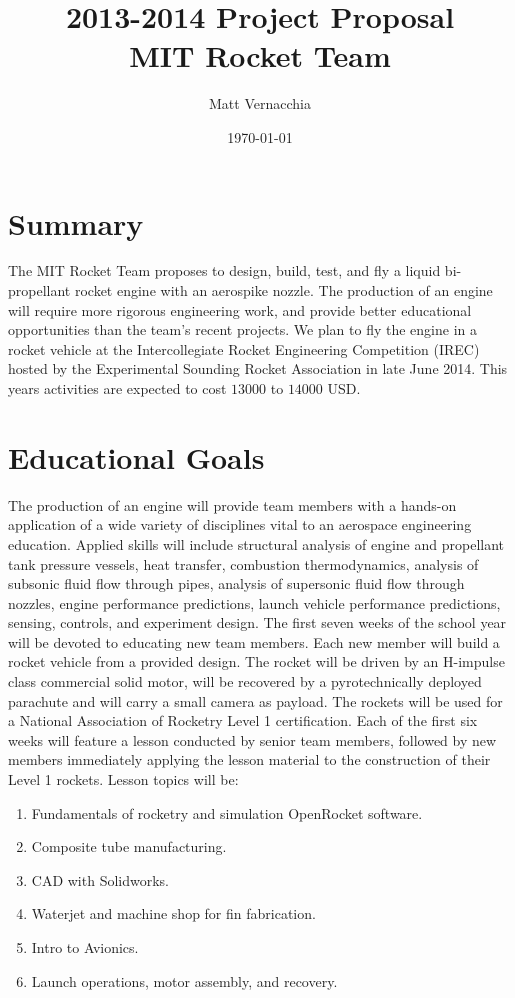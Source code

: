\documentclass{article}
\title{ 2013-2014 Project Proposal \\ MIT Rocket Team} %
\author{Matt Vernacchia} %
\date{ \today } %
\begin{document}
\maketitle
\section{Summary}
The MIT Rocket Team proposes to design, build, test, and fly a liquid bi-propellant rocket engine with an aerospike nozzle.
The production of an engine will require more rigorous engineering work, and provide better educational opportunities than the team's recent projects. We plan to fly the engine in a rocket vehicle at the Intercollegiate Rocket Engineering Competition (IREC) hosted by the Experimental Sounding Rocket Association in late June 2014. This years activities are expected to cost $13000$ to $14000$ USD.
\section{Educational Goals}
The production of an engine will provide team members with a hands-on application of a wide variety of disciplines vital to an aerospace engineering education. Applied skills will include structural analysis of engine and propellant tank pressure vessels, heat transfer, combustion thermodynamics, analysis of subsonic fluid flow through pipes, analysis of supersonic fluid flow through nozzles, engine performance predictions, launch vehicle performance predictions, sensing, controls, and experiment design.
The first seven weeks of the school year will be devoted to educating new team members. Each new member will build a rocket vehicle from a provided design. The rocket will be driven by an H-impulse class commercial solid motor, will be recovered by a pyrotechnically deployed parachute and will carry a small camera as payload. The rockets will be used for a National Association of Rocketry Level 1 certification. Each of the first six weeks will feature a lesson conducted by senior team members, followed by new members immediately applying the lesson material to the construction of their Level 1 rockets. Lesson topics will be:
\begin{enumerate}
\item Fundamentals of rocketry and simulation OpenRocket software.
\item Composite tube manufacturing.
\item CAD with Solidworks.
\item Waterjet and machine shop for fin fabrication.
\item Intro to Avionics.
\item Launch operations, motor assembly, and recovery.
\end{enumerate}
\end{document}
